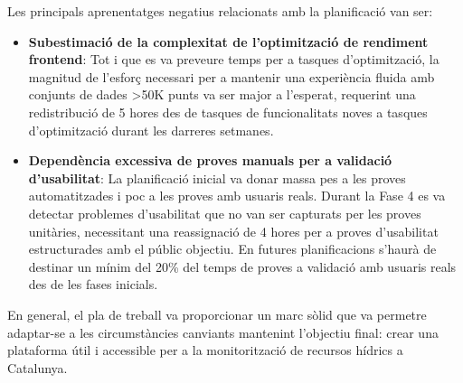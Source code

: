 Les principals aprenentatges negatius relacionats amb la planificació van ser:
\begin{itemize}
    \item \textbf{Subestimació de la complexitat de l'optimització de rendiment frontend}: Tot i que es va preveure temps per a tasques d'optimització, la magnitud de l'esforç necessari per a mantenir una experiència fluida amb conjunts de dades >50K punts va ser major a l'esperat, requerint una redistribució de 5 hores des de tasques de funcionalitats noves a tasques d'optimització durant les darreres setmanes.
    \item \textbf{Dependència excessiva de proves manuals per a validació d'usabilitat}: La planificació inicial va donar massa pes a les proves automatitzades i poc a les proves amb usuaris reals. Durant la Fase 4 es va detectar problemes d'usabilitat que no van ser capturats per les proves unitàries, necessitant una reassignació de 4 hores per a proves d'usabilitat estructurades amb el públic objectiu. En futures planificacions s'haurà de destinar un mínim del 20\% del temps de proves a validació amb usuaris reals des de les fases inicials.
\end{itemize}

En general, el pla de treball va proporcionar un marc sòlid que va permetre adaptar-se a les circumstàncies canviants mantenint l'objectiu final: crear una plataforma útil i accessible per a la monitorització de recursos hídrics a Catalunya.

